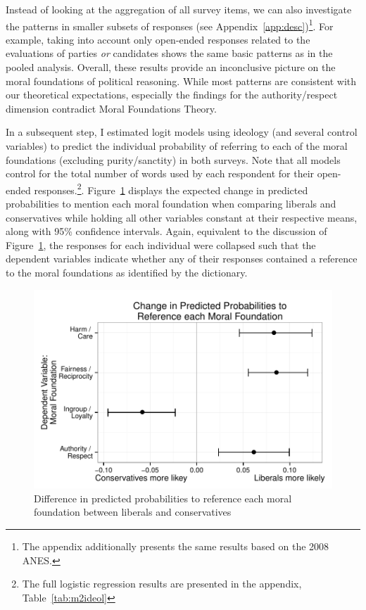 \documentclass[12pt]{article}
\begin{document}
Instead of looking at the aggregation of all survey items, we can also investigate the patterns in smaller subsets of responses (see Appendix~\ref{app:desc})\footnote{The appendix additionally presents the same results based on the 2008 ANES.}. For example, taking into account only open-ended responses related to the evaluations of parties \textit{or} candidates shows the same basic patterns as in the pooled analysis. Overall, these results provide an inconclusive picture on the moral foundations of political reasoning. While most patterns are consistent with our theoretical expectations, especially the findings for the authority/respect dimension contradict Moral Foundations Theory.

In a subsequent step, I estimated logit models using ideology (and several control variables) to predict the individual probability of referring to each of the moral foundations (excluding purity/sanctity) in both surveys. Note that all models control for the total number of words used by each respondent for their open-ended responses.\footnote{The full logistic regression results are presented in the appendix, Table~\ref{tab:m2ideol}}. Figure~\ref{fig:2ideol} displays the expected change in predicted probabilities to mention each moral foundation when comparing liberals and conservatives while holding all other variables constant at their respective means, along with 95\% confidence intervals. Again, equivalent to the discussion of Figure~\ref{fig:2ideol}, the responses for each individual were collapsed such that the dependent variables indicate whether any of their responses contained a reference to the moral foundations as identified by the dictionary. 

\begin{figure}\centering
\includegraphics{../calc/fig/fig2ideol.pdf}
\caption{Difference in predicted probabilities to reference each moral foundation between liberals and conservatives}\label{fig:2ideol}
\end{figure}
\end{document}
